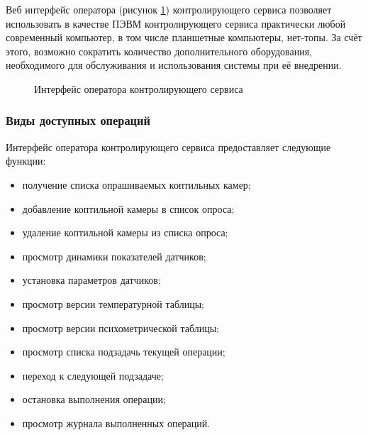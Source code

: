 Веб интерфейс оператора (рисунок \ref{img:acsIf}) контролирующего сервиса позволяет использовать в качестве
ПЭВМ контролирующего сервиса практически любой современный компьютер, в том числе планшетные компьютеры, нет-топы.
За счёт этого, возможно сократить количество дополнительного оборудования, необходимого для обслуживания и использования
системы при её внедрении.

\begin{figure}[ht]
	\caption{Интерфейс оператора контролирующего сервиса}
	\label{img:acsIf}
\end{figure}

\subsubsection{Виды доступных операций}
Интерфейс оператора контролирующего сервиса предоставляет следующие функции:
\begin{itemize}
	\item получение списка опрашиваемых коптильных камер;
	\item добавление коптильной камеры в список опроса;
	\item удаление коптильной камеры из списка опроса;
	\item просмотр динамики показателей датчиков;
	\item установка параметров датчиков;
	\item просмотр версии температурной таблицы;
	\item просмотр версии психометрической таблицы;
	\item просмотр списка подзадачь текущей операции;
	\item переход к следующей подзадаче;
	\item остановка выполнения операции;
	\item просмотр журнала выполненных операций.
\end{itemize}

